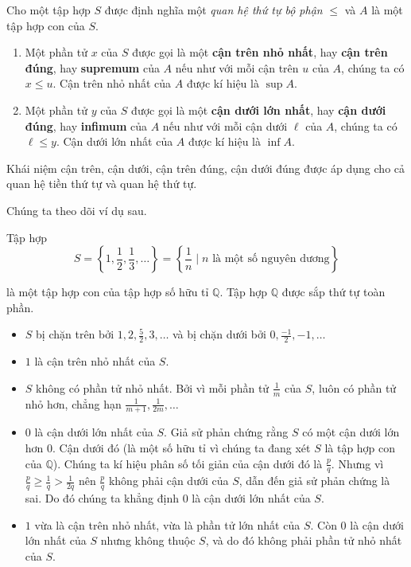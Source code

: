 \begin{definition}
    Cho một tập hợp $S$ được định nghĩa một \textit{quan hệ thứ tự bộ phận} $\leq$ và $A$ là một tập hợp con của $S$.
    \begin{enumerate}[label={(\roman*)}]
        \item Một phần tử $x$ của $S$ được gọi là một \textbf{cận trên nhỏ nhất}, hay \textbf{cận trên đúng}, hay \textbf{supremum} của $A$ nếu như với mỗi cận trên $u$ của $A$, chúng ta có $x\leq u$. Cận trên nhỏ nhất của $A$ được kí hiệu là $\sup A$.
        \item Một phần tử $y$ của $S$ được gọi là một \textbf{cận dưới lớn nhất}, hay \textbf{cận dưới đúng}, hay \textbf{infimum} của $A$ nếu như với mỗi cận dưới $\ell$ của $A$, chúng ta có $\ell\leq y$. Cận dưới lớn nhất của $A$ được kí hiệu là $\inf A$.
    \end{enumerate}
\end{definition}

Khái niệm cận trên, cận dưới, cận trên đúng, cận dưới đúng được áp dụng cho cả quan hệ tiền thứ tự và quan hệ thứ tự.

Chúng ta theo dõi ví dụ sau.
\begin{example}
    Tập hợp
    \[
        S = \left\{ 1, \frac{1}{2}, \frac{1}{3}, \ldots \right\} = \left\{ \frac{1}{n} \mid \text{$n$ là một số nguyên dương} \right\}
    \]

    là một tập hợp con của tập hợp số hữu tỉ $\mathbb{Q}$. Tập hợp $\mathbb{Q}$ được sắp thứ tự toàn phần.
    \begin{itemize}
        \item $S$ bị chặn trên bởi $1, 2, \frac{5}{2}, 3, \ldots$ và bị chặn dưới bởi $0, \frac{-1}{2}, -1, \ldots$
        \item $1$ là cận trên nhỏ nhất của $S$.
        \item $S$ không có phần tử nhỏ nhất. Bởi vì mỗi phần tử $\frac{1}{m}$ của $S$, luôn có phần tử nhỏ hơn, chẳng hạn $\frac{1}{m+1}, \frac{1}{2m}, \ldots$
        \item $0$ là cận dưới lớn nhất của $S$. Giả sử phản chứng rằng $S$ có một cận dưới lớn hơn $0$. Cận dưới đó (là một số hữu tỉ vì chúng ta đang xét $S$ là tập hợp con của $\mathbb{Q}$). Chúng ta kí hiệu phân số tối giản của cận dưới đó là $\frac{p}{q}$. Nhưng vì $\frac{p}{q}\geq \frac{1}{q} > \frac{1}{2q}$ nên $\frac{p}{q}$ không phải cận dưới của $S$, dẫn đến giả sử phản chứng là sai. Do đó chúng ta khẳng định $0$ là cận dưới lớn nhất của $S$.
        \item $1$ vừa là cận trên nhỏ nhất, vừa là phần tử lớn nhất của $S$. Còn $0$ là cận dưới lớn nhất của $S$ nhưng không thuộc $S$, và do đó không phải phần tử nhỏ nhất của $S$.
    \end{itemize}
\end{example}

